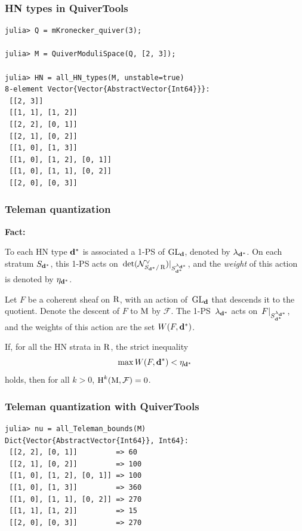 \documentclass{beamer}
\begin{document}
\begin{frame}[fragile]
    \frametitle{HN types in QuiverTools}
\begin{lstlisting}
julia> Q = mKronecker_quiver(3);

julia> M = QuiverModuliSpace(Q, [2, 3]);

julia> HN = all_HN_types(M, unstable=true)
8-element Vector{Vector{AbstractVector{Int64}}}:
 [[2, 3]]
 [[1, 1], [1, 2]]
 [[2, 2], [0, 1]]
 [[2, 1], [0, 2]]
 [[1, 0], [1, 3]]
 [[1, 0], [1, 2], [0, 1]]
 [[1, 0], [1, 1], [0, 2]]
 [[2, 0], [0, 3]]
\end{lstlisting}
\end{frame}

\begin{frame}
    \frametitle{Teleman quantization}
\textbf{Fact:}

To each HN type $\mathbf{d}^*$ is associated a 1-PS of $\operatorname{GL}_{\mathbf{d}}$,
denoted by $\lambda_{\mathbf{d}^*}$.
On each stratum $S_{\mathbf{d}^*}$, this 1-PS acts
on~$\det(\mathcal{N}^{\vee}_{S_{\mathbf{d}^*}/\operatorname{R}})|_{S_{\mathbf{d}^*}^{\lambda_{\mathbf{d}^*}}}$,
and the \emph{weight} of this action is denoted by $\eta_{\mathbf{d}^*}$. \pause

Let $F$ be a coherent sheaf on $\operatorname{R}$, with an action of~$\operatorname{GL}_{\mathbf{d}}$
that descends it to the quotient.
Denote the descent of $F$ to $\operatorname{M}$ by $\mathcal{F}$. \pause
The 1-PS~$\lambda_{\mathbf{d}^*}$ acts on~$F|_{S_{\mathbf{d}^*}^{\lambda_{\mathbf{d}^*}}}$,
and the weights of this action are the set $W(F, \mathbf{d}^*)$. \pause

\begin{theorem}
If, for all the HN strata in $\operatorname{R}$, the strict inequality
\[\max W(F, \mathbf{d}^*) < \eta_{\mathbf{d}^*}\]
holds, then for all $k > 0$, $\operatorname{H}^k(\operatorname{M}, \mathcal{F}) = 0$.
\end{theorem}
\end{frame}

\begin{frame}[fragile]
    \frametitle{Teleman quantization with QuiverTools}
\small{
\begin{lstlisting}
julia> nu = all_Teleman_bounds(M)
Dict{Vector{AbstractVector{Int64}}, Int64}:
 [[2, 2], [0, 1]]         => 60
 [[2, 1], [0, 2]]         => 100
 [[1, 0], [1, 2], [0, 1]] => 100
 [[1, 0], [1, 3]]         => 360
 [[1, 0], [1, 1], [0, 2]] => 270
 [[1, 1], [1, 2]]         => 15
 [[2, 0], [0, 3]]         => 270
\end{lstlisting}
}
\end{frame}
\end{document}
